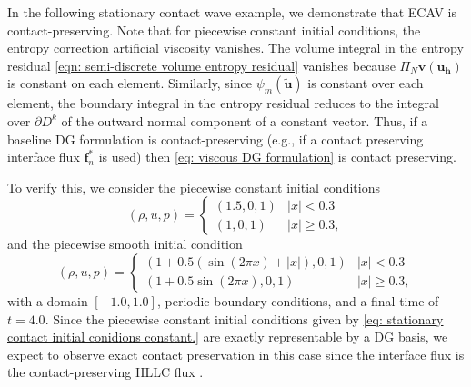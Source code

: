 \documentclass{elsarticle}
\theoremstyle{definition}
\theoremstyle{plain}
\theoremstyle{plain}
\newcommand{\reftwo}[1]{{\color{blue}#1}}
\renewcommand{\reftwo}[1]{#1}
\begin{document}
In the following stationary contact wave example, we demonstrate that ECAV is contact-preserving. Note that for piecewise constant initial conditions, the entropy correction artificial viscosity vanishes. The volume integral in the entropy residual \eqref{eqn: semi-discrete volume entropy residual} vanishes because $\reftwo{\Pi_N \bm{v}(\bm{u_h})}$ is constant on each element. Similarly, since $\psi_m(\tilde{\bm{u}})$ is constant over each element, the boundary integral in the entropy residual reduces to the integral over $\partial D^k$ of the outward normal component of a constant vector. Thus, if a baseline DG formulation is contact-preserving (e.g., if a contact preserving interface flux $\bm{f}^*_n$ is used) then \eqref{eq: viscous DG formulation} is contact preserving. 

To verify this, we consider the piecewise constant initial conditions
\begin{equation}\label{eq: stationary contact initial conidions constant.}
(\rho, u, p) = \begin{cases}
    (1.5, 0,1) & |x| < 0.3\\
    (1,0,1) & |x| \geq 0.3,
\end{cases}
\end{equation}
and the piecewise smooth initial condition
\begin{equation}\label{eq: stationary contact initial conidions not constant.}
(\rho, u, p) = \begin{cases}
    (1 + 0.5(\sin{(2\pi x)}+|x|), 0,1) & |x| < 0.3\\
    (1 + \reftwo{0.5}\sin{(2\pi x)},0,1) & |x| \geq 0.3,
\end{cases}
\end{equation}
with a domain $[-1.0,1.0]$, periodic boundary conditions, and a final time of $t = 4.0$. Since the piecewise constant initial conditions given by \eqref{eq: stationary contact initial conidions constant.} are exactly representable by a DG basis, we expect to observe exact contact preservation in this case since the interface flux is the contact-preserving HLLC flux \cite{batten1997choice}. 
\end{document}
